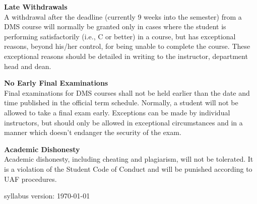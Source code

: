 \documentclass[12pt]{article}
\renewcommand{\emph}[1]{\textsf{\textbf{#1}}}
\newcommand{\localhead}[1]{\par\smallskip\textbf{#1}\nobreak\\}%
\def\heading#1{\localhead{\large\emph{#1}}}
\def\subheading#1{\localhead{\emph{#1}}}
\begin{document}
\subheading{Late Withdrawals} 
A withdrawal after the deadline (currently 9 weeks into the semester) from a DMS course will normally be granted only in cases where the student is performing satisfactorily (i.e., C or better) in a course, but has exceptional reasons, beyond his/her control, for being unable to complete the course. These exceptional reasons should be detailed in writing to the instructor, department head and dean.

\subheading{No Early Final Examinations}
Final examinations for DMS courses shall not be held earlier than the date and time published in the official term schedule. Normally, a student will not be allowed to take a final exam early. Exceptions can be made by individual instructors, but should only be allowed in exceptional circumstances and in a manner which doesn't endanger the security of the exam.

\subheading{Academic Dishonesty}
Academic dishonesty, including cheating and plagiarism, will not be tolerated.  It is a violation of the Student Code of Conduct and will be punished according to UAF procedures.

\vfill
\hfill \scriptsize syllabus version: \today \normalsize

\end{document}
